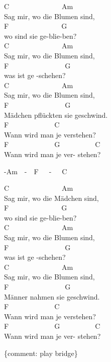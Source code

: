 \documentclass[
  letterpaper,
]{scrbook}
\begin{document}
C~~~~~~~~~~~~~~~Am~~~~~~~~~~~\\
Sag mir, wo die Blumen sind,\\
F~~~~~~~~~~~~~~~G\\
wo sind sie ge-blie-ben?\\
C~~~~~~~~~~~~~~~Am~~~~~~~~~~~\\
Sag mir, wo die Blumen sind,\\
F~~~~~~~~~~~~~~~~G\\
was ist ge -schehen?\\
C~~~~~~~~~~~~~~~Am~~~~~~~~~~~\\
Sag mir, wo die Blumen sind,\\
F~~~~~~~~~~~~~~~~G\\
Mädchen pflückten sie geschwind.\\
F~~~~~~~~~~~~~C~~~~~~~~~~~~~~~~~\\
Wann wird man je verstehen?~~~~~\\
F~~~~~~~~~~~~~G~~~~~~~~~~C\\
Wann wird man je ver- stehen?

-Am~~-~~F~~~-~~~C

C~~~~~~~~~~~~~~~Am~~~~~~~~~~~\\
Sag mir, wo die Mädchen sind,\\
F~~~~~~~~~~~~~~~G\\
wo sind sie ge-blie-ben?\\
C~~~~~~~~~~~~~~~Am~~~~~~~~~~~\\
Sag mir, wo die Blumen sind,\\
F~~~~~~~~~~~~~~~~G\\
was ist ge -schehen?\\
C~~~~~~~~~~~~~~~Am~~~~~~~~~~~\\
Sag mir, wo die Blumen sind,\\
F~~~~~~~~~~~~~~~~G\\
Männer nahmen sie geschwind.\\
F~~~~~~~~~~~~~C~~~~~~~~~~~~~~~~~\\
Wann wird man je verstehen?~~~~~\\
F~~~~~~~~~~~~~G~~~~~~~~~~C\\
Wann wird man je ver- stehen?

\{comment: play bridge\}
\end{document}
